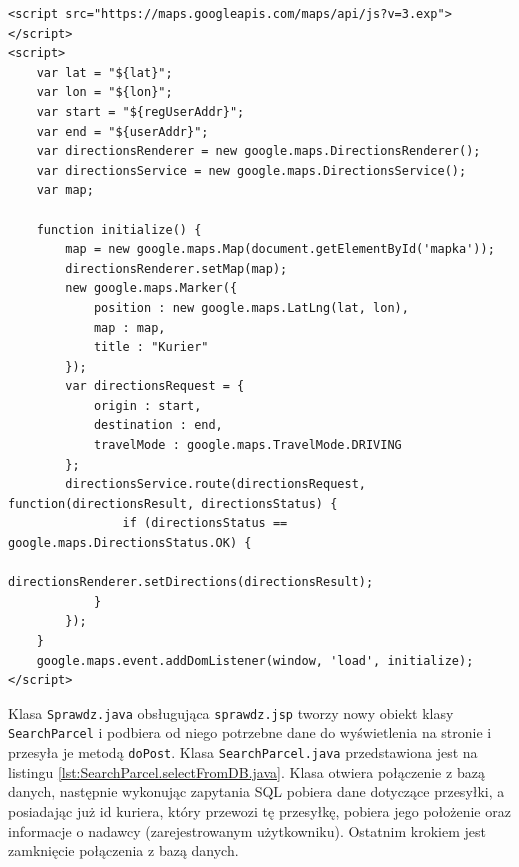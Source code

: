 \documentclass[eng,printmode,oneside]{mgr}
\begin{document}
\begin{lstlisting}[caption=Kod JavaScript'owy pobierający mapę z
serwera Google,label=lst:maps.JS] 
<script src="https://maps.googleapis.com/maps/api/js?v=3.exp"></script> 
<script>
	var lat = "${lat}";
	var lon = "${lon}";
	var start = "${regUserAddr}";
	var end = "${userAddr}";
	var directionsRenderer = new google.maps.DirectionsRenderer();
	var directionsService = new google.maps.DirectionsService();
	var map;

	function initialize() {
		map = new google.maps.Map(document.getElementById('mapka'));
		directionsRenderer.setMap(map);
		new google.maps.Marker({
			position : new google.maps.LatLng(lat, lon),
			map : map,
			title : "Kurier"
		});
		var directionsRequest = {
			origin : start,
			destination : end,
			travelMode : google.maps.TravelMode.DRIVING
		};
		directionsService.route(directionsRequest, function(directionsResult, directionsStatus) {
				if (directionsStatus == google.maps.DirectionsStatus.OK) {
					directionsRenderer.setDirections(directionsResult);
			}
		});
	}
	google.maps.event.addDomListener(window, 'load', initialize);
</script>
\end{lstlisting}

Klasa \texttt{Sprawdz.java} obsługująca \texttt{sprawdz.jsp} tworzy nowy obiekt
klasy \texttt{SearchParcel} i podbiera od niego potrzebne dane do wyświetlenia
na stronie i przesyła je metodą \texttt{doPost}. Klasa
\texttt{SearchParcel.java} przedstawiona jest na listingu
\ref{lst:SearchParcel.selectFromDB.java}. Klasa otwiera połączenie z bazą danych, 
następnie wykonując zapytania SQL pobiera dane dotyczące przesyłki, a
posiadając już id kuriera, który przewozi tę przesyłkę, pobiera jego położenie
oraz informacje o nadawcy (zarejestrowanym użytkowniku). Ostatnim
krokiem jest zamknięcie połączenia z bazą danych.
\end{document}
